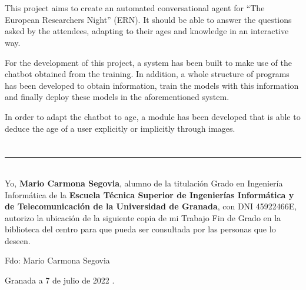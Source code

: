 \\

\vspace{0.7cm}
\\

This project aims to create an automated conversational agent for ``The European Researchers Night'' (ERN). It should be able to answer the questions asked by the attendees, adapting to their ages and knowledge in an interactive way.

For the development of this project, a system has been built to make use of the chatbot obtained from the training. In addition, a whole structure of programs has been developed to obtain information, train the models with this information and finally deploy these models in the aforementioned system.

In order to adapt the chatbot to age, a module has been developed that is able to deduce the age of a user explicitly or implicitly through images.

\chapter*{}
\thispagestyle{empty}

\noindent\rule[-1ex]{\textwidth}{2pt}\\[4.5ex]

Yo, \textbf{Mario Carmona Segovia}, alumno de la titulación Grado en Ingeniería Informática de la \textbf{Escuela Técnica Superior
de Ingenierías Informática y de Telecomunicación de la Universidad de Granada}, con DNI 45922466E, autorizo la
ubicación de la siguiente copia de mi Trabajo Fin de Grado en la biblioteca del centro para que pueda ser
consultada por las personas que lo deseen.

\vspace{6cm}

\noindent Fdo: Mario Carmona Segovia

\vspace{2cm}

\begin{flushright}
Granada a 7 de julio de 2022 .
\end{flushright}


\chapter*{}
\thispagestyle{empty}

